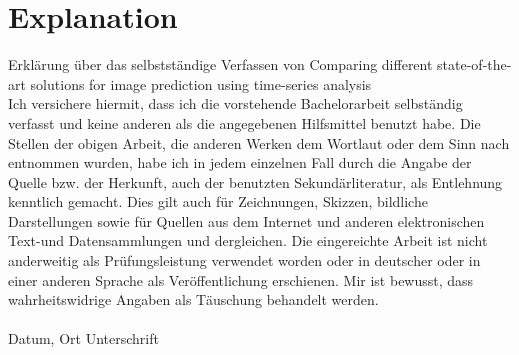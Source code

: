 \section{Explanation}
Erklärung über das selbstständige Verfassen von \glqq Comparing different state-of-the-art solutions for image prediction using time-series analysis\grqq\\
Ich versichere hiermit, dass ich die vorstehende Bachelorarbeit selbständig verfasst und keine anderen als die angegebenen Hilfsmittel benutzt habe. Die Stellen der obigen Arbeit, die anderen Werken dem Wortlaut oder dem Sinn nach entnommen wurden, habe ich in jedem einzelnen Fall durch die Angabe der Quelle bzw. der Herkunft, auch der benutzten Sekundärliteratur, als Entlehnung kenntlich gemacht. Dies gilt auch für Zeichnungen, Skizzen, bildliche Darstellungen sowie für Quellen aus dem Internet und anderen elektronischen Text-und Datensammlungen und dergleichen. Die eingereichte Arbeit ist nicht anderweitig als Prüfungsleistung verwendet worden oder in deutscher oder in einer anderen Sprache als Veröffentlichung erschienen. Mir ist bewusst, dass wahrheitswidrige Angaben als Täuschung behandelt werden.\\\\
Datum, Ort Unterschrift\\